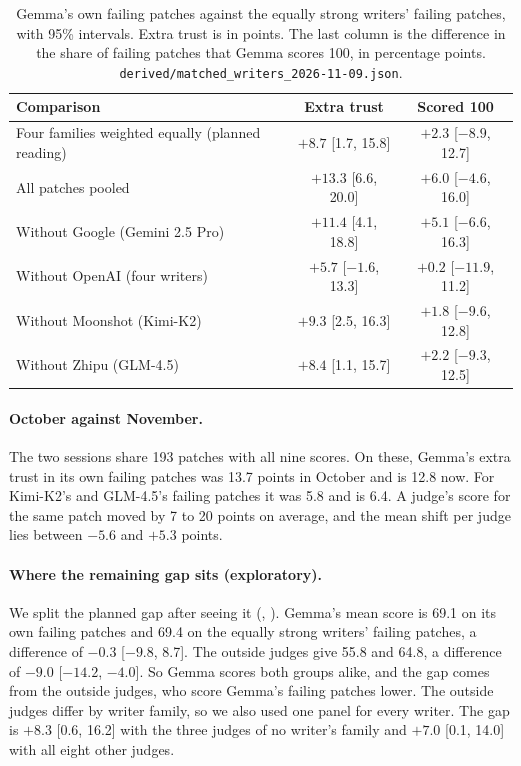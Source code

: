 \documentclass[10pt,letterpaper]{article}
\begin{document}
\begin{table}[H]
\centering
\small
\caption{Gemma's own failing patches against the equally strong writers' failing patches, with 95\% intervals. Extra
trust is in points. The last column is the difference in the share of failing patches that Gemma scores 100, in
percentage points. \texttt{derived/matched\_writers\_2026-11-09.json}.}
\label{tab:equalgap}
\begin{tabular}{@{}lcc@{}}
\toprule
Comparison & Extra trust & Scored 100 \\
\midrule
Four families weighted equally (planned reading) & $+8.7$ [1.7, 15.8] & $+2.3$ [$-8.9$, 12.7] \\
All patches pooled & $+13.3$ [6.6, 20.0] & $+6.0$ [$-4.6$, 16.0] \\
Without Google (Gemini 2.5 Pro) & $+11.4$ [4.1, 18.8] & $+5.1$ [$-6.6$, 16.3] \\
Without OpenAI (four writers) & $+5.7$ [$-1.6$, 13.3] & $+0.2$ [$-11.9$, 11.2] \\
Without Moonshot (Kimi-K2) & $+9.3$ [2.5, 16.3] & $+1.8$ [$-9.6$, 12.8] \\
Without Zhipu (GLM-4.5) & $+8.4$ [1.1, 15.7] & $+2.2$ [$-9.3$, 12.5] \\
\bottomrule
\end{tabular}
\end{table}

\paragraph{October against November.} The two sessions share 193 patches with all nine scores. On these, Gemma's
extra trust in its own failing patches was 13.7 points in October and is 12.8 now. For Kimi-K2's and GLM-4.5's
failing patches it was 5.8 and is 6.4. A judge's score for the same patch moved by 7 to 20 points on average, and the
mean shift per judge lies between $-5.6$ and $+5.3$ points.

\paragraph{Where the remaining gap sits (exploratory).} We split the planned gap after seeing it
(, ). Gemma's mean score is
69.1 on its own failing patches and 69.4 on the equally strong writers' failing patches, a difference of $-0.3$
[$-9.8$, 8.7]. The outside judges give 55.8 and 64.8, a difference of $-9.0$ [$-14.2$, $-4.0$]. So Gemma scores both
groups alike, and the gap comes from the outside judges, who score Gemma's failing patches lower. The outside judges
differ by writer family, so we also used one panel for every writer. The gap is $+8.3$ [0.6, 16.2] with the three
judges of no writer's family and $+7.0$ [0.1, 14.0] with all eight other judges.
\end{document}
